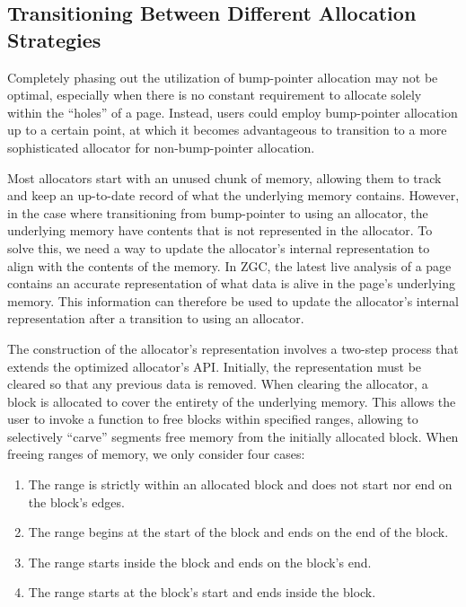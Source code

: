 \subsection{Transitioning Between Different Allocation Strategies}

Completely phasing out the utilization of bump-pointer allocation may not be optimal, especially when there is no constant requirement to allocate solely within the ``holes'' of a page. Instead, users could employ bump-pointer allocation up to a certain point, at which it becomes advantageous to transition to a more sophisticated allocator for non-bump-pointer allocation.

Most allocators start with an unused chunk of memory, allowing them to track and keep an up-to-date record of what the underlying memory contains. However, in the case where transitioning from bump-pointer to using an allocator, the underlying memory have contents that is not represented in the allocator. To solve this, we need a way to update the allocator's internal representation to align with the contents of the memory. In ZGC, the latest live analysis of a page contains an accurate representation of what data is alive in the page's underlying memory. This information can therefore be used to update the allocator's internal representation after a transition to using an allocator.

The construction of the allocator's representation involves a two-step process that extends the optimized allocator's API. Initially, the representation must be cleared so that any previous data is removed. When clearing the allocator, a block is allocated to cover the entirety of the underlying memory. This allows the user to invoke a function to free blocks within specified ranges, allowing to selectively ``carve'' segments free memory from the initially allocated block. When freeing ranges of memory, we only consider four cases: 

\begin{enumerate}
    \item The range is strictly within an allocated block and does not start nor end on the block's edges.
    \item The range begins at the start of the block and ends on the end of the block.
    \item The range starts inside the block and ends on the block's end.
    \item The range starts at the block's start and ends inside the block.
\end{enumerate}

